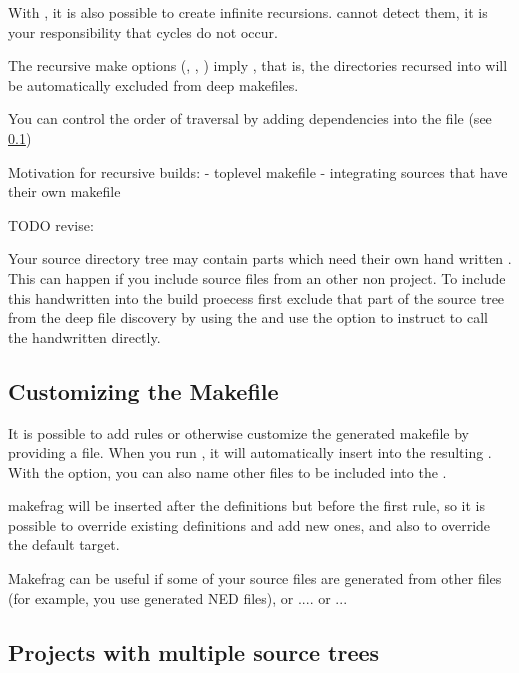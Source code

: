 \begin{note}
With , it is also possible to create infinite recursions.
 cannot detect them, it is your responsibility that
cycles do not occur.
\end{note}

The recursive make options (, , )
imply , that is, the directories recursed into will be
automatically excluded from deep makefiles.

You can control the order of traversal by adding dependencies into
the  file (see \ref{sec:makefrag})

Motivation for recursive builds:
 - toplevel makefile
 - integrating sources that have their own makefile


TODO revise:

Your source directory tree may contain parts which need their own hand
written . This can happen if you include source files from an
other non {\opp} project. To include this handwritten  into
the build proecess first exclude that part of the source tree from the deep
file discovery by using the  and use the
 option to instruct
 to call the handwritten  directly.


\subsection{Customizing the Makefile}
\label{sec:makefrag}

It is possible to add rules or otherwise customize the generated makefile
by providing a  file. When you run , it
will automatically insert  into the resulting .
With the  option, you can also name other files to be included into the
.

makefrag will be inserted after the definitions but before the first
rule, so it is possible to override existing definitions and add new
ones, and also to override the default target.

Makefrag can be useful if some of your source files are generated
from other files (for example, you use generated NED files), or ....
or ...


\subsection{Projects with multiple source trees}

